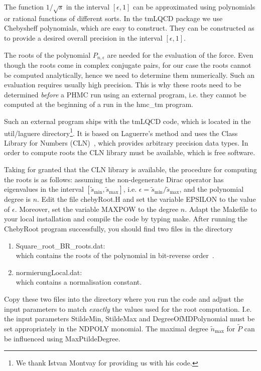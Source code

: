 \label{sec:root}

The function $1/\sqrt{s}$ in the interval $[\epsilon,1]$ can be
approximated using polynomials or rational functions of different
sorts. In the tmLQCD package we use Chebysheff polynomials, which
are easy to construct. They can be constructed as to provide a desired
overall precision in the interval $[\epsilon,1]$. 

The roots of the
polynomial $P_{n,\epsilon}$ are needed for the evaluation of the
force. Even though the roots come in complex conjugate pairs, for our
case the roots cannot be computed analytically, hence we need to
determine them numerically. Such an evaluation requires usually
high precision. This is why these roots need to be determined
\emph{before} a PHMC run using an external program, i.e. they cannot
be computed at the beginning of a run in the {\ttfamily hmc\_tm}
program. 

Such an external program ships with the tmLQCD code, which is located in the
{\ttfamily util/laguere} directory\footnote{We thank Istvan Montvay
  for providing us with his code.}. It is based on Laguerre's
method and uses the Class Library for Numbers
(CLN)~\cite{cln:web}, which provides arbitrary precision data
types. In order to compute roots the CLN library must be available,
which is free software.

Taking for granted that the CLN library is available,
the procedure for computing the roots is as follows: assuming the
non-degenerate Dirac operator has eigenvalues in the interval $[\tilde
s_\mathrm{min},\tilde s_\mathrm{max}]$, i.e. $\epsilon = \tilde
s_\mathrm{min}/\tilde s_\mathrm{max}$, and the polynomial degree is
$n$. Edit the file {\ttfamily chebyRoot.H} and set the
variable {\ttfamily EPSILON} to the value of $\epsilon$. Moreover,
set the variable {\ttfamily MAXPOW} to the degree $n$. Adapt the
{\ttfamily Makefile} to your local installation and compile the code
by typing {\ttfamily make}. After running the {\ttfamily ChebyRoot}
program successfully, you should find two files in the directory
\begin{enumerate}
\item {\ttfamily Square\_root\_BR\_roots.dat}:\\
  which contains the roots of the polynomial in bit-reverse
  order~\cite{Frezzotti:1997ym}.
\item {\ttfamily normierungLocal.dat}:\\
  which contains a normalisation constant. 
\end{enumerate}
Copy these two files into the directory where you run the code and
adjust the input parameters to match \emph{exactly} the values used
for the root computation. I.e. the input parameters {\ttfamily
  StildeMin}, {\ttfamily StildeMax} and {\ttfamily
  DegreeOfMDPolynomial} must be set appropriately in the {\ttfamily
  NDPOLY} monomial. The maximal degree $\tilde n_\mathrm{max}$ for
$\tilde P$ can be influenced using {\ttfamily MaxPtildeDegree}.

